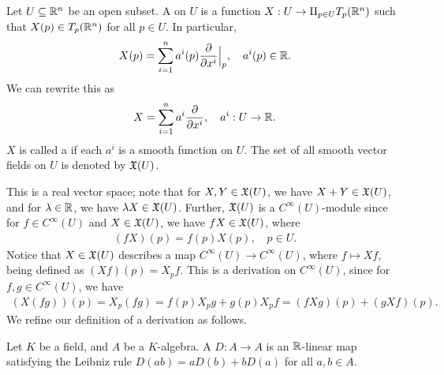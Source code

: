 \begin{definition}
    Let $U \subseteq \mathbb{R}^{n}$ be an open subset. A  on $U$ is a function $X:U \to \amalg_{p \in U} T_{p}(\mathbb{R}^{n})$ such that $X(p) \in T_{p}(\mathbb{R}^{n})$ for all $p \in U$. In particular,
    \begin{align}
        X(p) = \sum_{i=1}^{n} a^{i}(p) \frac{\partial}{\partial x^{i}}\Big|_{p}, \quad a^{i}(p) \in \mathbb{R}.
    \end{align}
    We can rewrite this as
    \begin{align}
        X = \sum_{i=1}^{n} a^{i} \frac{\partial}{\partial x^{i}}, \quad a^{i}:U \to \mathbb{R}.
    \end{align}
    $X$ is called a  if each $a^{i}$ is a smooth function on $U$. The set of all smooth vector fields on $U$ is denoted by $\mathfrak{X}(U)$.
\end{definition}
This is a real vector space; note that for $X,Y \in \mathfrak{X}(U)$, we have $X+Y \in \mathfrak{X}(U)$, and for $\lambda \in \mathbb{R}$, we have $\lambda X \in \mathfrak{X}(U)$. Further, $\mathfrak{X}(U)$ is a $C^{\infty}(U)$-module since for $f \in C^{\infty}(U)$ and $X \in \mathfrak{X}(U)$, we have $fX \in \mathfrak{X}(U)$, where
\begin{align}
    (fX)(p) = f(p)X(p), \quad p \in U.
\end{align}
Notice that $X \in \mathfrak{X}(U)$ describes a map $C^{\infty}(U) \to C^{\infty}(U)$, where $f \mapsto Xf$, being defined as $(Xf)(p)=X_{p}f$. This is a derivation on $C^{\infty}(U)$, since for $f,g \in C^{\infty}(U)$, we have
\begin{align}
    (X(fg))(p) = X_{p}(fg) = f(p)X_{p}g + g(p)X_{p}f = (fXg)(p) + (gXf)(p).
\end{align}
We refine our definition of a derivation as follows.
\begin{definition}
    Let $K$ be a field, and $A$ be a $K$-algebra. A  $D:A \to A$ is an $\mathbb{R}$-linear map satisfying the Leibniz rule $D(ab) = aD(b) + bD(a)$ for all $a,b \in A$.
\end{definition}

